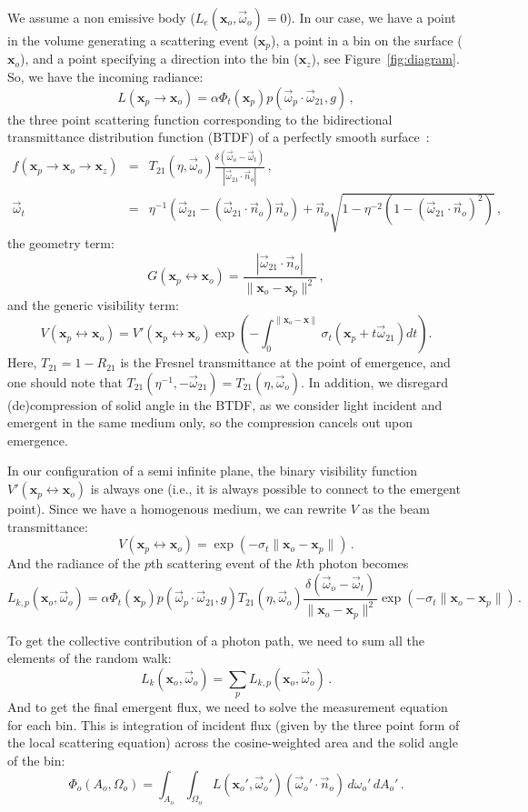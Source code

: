\documentclass[10pt,a4paper]{article}
\newcommand{\x}{\mathbf{x}}
\newcommand{\y}{\mathbf{x}_o}
\newcommand{\z}{\mathbf{x}_z}
\newcommand{\vomega}{\vec{\omega}}
\begin{document}
We assume a non emissive body ($L_e(\x_o, \vomega_o) = 0$). In our case, we have a point in the volume generating a scattering event ($\x_p$), a point in a bin on the surface ($\y$), and a point specifying a direction into the bin ($\z$), see Figure~\ref{fig:diagram}. So, we have the incoming radiance:
%
\[
L(\x_p \rightarrow \y) = \alpha \Phi_t(\mathbf{x}_p) p(\vomega_p \cdot \vomega_{21}, g) \, ,
\]
%
the three point scattering function corresponding to the bidirectional transmittance distribution function (BTDF) of a perfectly smooth surface~\cite{pharr17}:
%
\begin{eqnarray}
f(\x_p \rightarrow \y \rightarrow \z) & = & T_{21}(\eta, \vomega_o) \frac{\delta(\vomega_o - \vomega_t)}{|\vomega_{21}\cdot\vec{n}_o|} \, , \label{eq:btdf} \\
\vomega_t & = & \eta^{-1}(\vomega_{21} - (\vomega_{21}\cdot\vec{n}_o)\vec{n}_o) + \vec{n}_o \sqrt{1 - \eta^{-2}(1 - (\vomega_{21}\cdot\vec{n}_o)^2)} \, , \nonumber
\end{eqnarray}
%
the geometry term:
%
\[
G(\x_p \leftrightarrow \y) = \frac{|\vomega_{21}\cdot\vec{n}_o |}{\|\y - \x_p\|^2} \, ,
\]
%
and the generic visibility term:
%
\[
V(\x_p \leftrightarrow \y) = V'(\x_p \leftrightarrow \y) \exp\left(-\int_0^{\|\y - \x\|} \sigma_t\left(\x_p + t \vomega_{21}\right) dt\right) .
\]
%
Here, $T_{21} = 1 - R_{21}$ is the Fresnel transmittance at the point of emergence, and one should note that $T_{21}(\eta^{-1}, -\vomega_{21}) = T_{21}(\eta, \vomega_o)$. In addition, we disregard (de)compression of solid angle in the BTDF, as we consider light incident and emergent in the same medium only, so the compression cancels out upon emergence.

In our configuration of a semi infinite plane, the binary visibility function $V'(\x_p \leftrightarrow \y)$ is always one (i.e., it is always possible to connect to the emergent point). Since we have a homogenous medium, we can rewrite $V$ as the beam transmittance:
%
\[
V(\x_p \leftrightarrow \y) = \exp(-\sigma_t \|\y - \x_p\|) \, .
\]
%
And the radiance of the $p$th scattering event of the $k$th photon becomes
%
\[
L_{k,p}(\x_o, \vomega_o) = \alpha \Phi_t(\mathbf{x}_p) p(\vomega_p \cdot \vomega_{21}, g)  T_{21}(\eta, \vomega_o) \frac{\delta(\vomega_o - \vomega_t)}{\|\y - \x_p\|^2} \exp(-\sigma_t \|\y - \x_p\|) \, .
\]

To get the collective contribution of a photon path, we need to sum all the elements of the random walk:
%
\[
L_k(\x_o, \vomega_o) = \sum_p L_{k,p}(\x_o, \vomega_o) \, .
\]
%
And to get the final emergent flux, we need to solve the measurement equation for each bin. This is integration of incident flux (given by the three point form of the local scattering equation) across the cosine-weighted area and the solid angle of the bin:
%
\[
\Phi_o(A_o, \Omega_o) = \int_{A_o} \int_{\Omega_o} L(\x_o', \vomega_o') (\vomega_o' \cdot \vec{n}_o) \, d\omega_o' \, dA_o' \, .
\]
\end{document}
